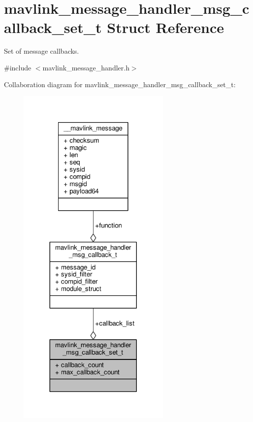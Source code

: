 \hypertarget{structmavlink__message__handler__msg__callback__set__t}{\section{mavlink\+\_\+message\+\_\+handler\+\_\+msg\+\_\+callback\+\_\+set\+\_\+t Struct Reference}
\label{structmavlink__message__handler__msg__callback__set__t}
}


Set of message callbacks.  




{\ttfamily \#include $<$mavlink\+\_\+message\+\_\+handler.\+h$>$}



Collaboration diagram for mavlink\+\_\+message\+\_\+handler\+\_\+msg\+\_\+callback\+\_\+set\+\_\+t\+:
\nopagebreak
\begin{figure}[H]
\begin{center}
\leavevmode
\includegraphics[width=212pt]{structmavlink__message__handler__msg__callback__set__t__coll__graph}
\end{center}
\end{figure}
